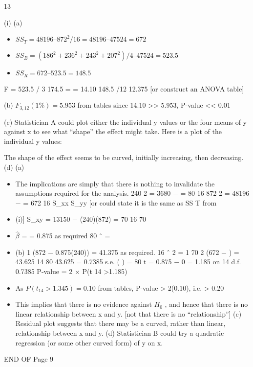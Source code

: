 \documentclass[a4paper,12pt]{article}
\begin{document}

13
\item (i)
(a)
\begin{itemize}
\item $ { \displaystyle SS_T = 48196 – 872^2 /16 = 48196 – 47524 = 672 }$
\item $ { \displaystyle SS_B = (186^2 + 236^2 + 243^2 + 207^2 )/4 – 47524 = 523.5 }$
\item $ { \displaystyle SS_R = 672 – 523.5 = 148.5 }$
\end{itemize} 
F =
523.5 / 3 174.5
=
= 14.10
148.5 /12 12.375
[or construct an ANOVA table]
\item (b)
$F_{3,12} (1\%) = 5.953$ from tables
since 14.10 >> 5.953, P-value << 0.01
\item (c)
Statistician A could plot either the individual y values or the four
means of y against x to see what “shape” the effect might take.
Here is a plot of the individual y values:
\item The shape of the effect seems to be curved, initially increasing, then
decreasing.
(d)
(a)
\begin{itemize}
\item The implications are simply that there is nothing to invalidate the
assumptions required for the analysis.
240 2
= 3680 −
= 80
16
872 2
= 48196 −
= 672
16
S_{xx}
S_{yy}
[or could state it is the same as SS T from \item (i)]
S_{xy} = 13150 −
(240)(872)
= 70
16
70
\item $\hat{\beta}$ = = 0.875 as required
80
\alpha ˆ =

\item (b)
1
(872 − 0.875(240)) = 41.375 as required.
16
\sum ˆ 2 =
1
70 2
(672 −
) = 43.625
14
80
43.625
= 0.7385
s.e. (  ) =
80
t =
0.875 − 0
= 1.185 on 14 d.f.
0.7385
P-value = 2 × P(t 14 >1.185)
\item As $P(t_{14} >1.345) = 0.10$ from tables, P-value > 2(0.10), i.e. > 0.20
\item This implies that there is no evidence against $H_0$ , and hence that there
is no linear relationship between x and y.
[not that there is no “relationship”]
(c) Residual plot suggests that there may be a curved, rather than linear,
relationship between x and y.
(d) Statistician B could try a quadratic regression (or some other curved
form) of y on x.
\end{itemize}
END OF %
Page 9
\end{document}
